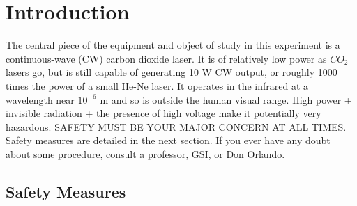 \documentclass{../lab}
\begin{document}
\section{Introduction}

The central piece of the equipment and object of study in this experiment is a continuous-wave (CW) carbon dioxide laser. It is of relatively low power as $CO_2$ lasers go, but is still capable of generating 10 W CW output, or roughly 1000 times the power of a small He-Ne laser. It operates in the infrared at a wavelength near $10^{-6}$ m and so is outside the human visual range. High power + invisible radiation + the presence of high voltage make it potentially very hazardous. SAFETY MUST BE YOUR MAJOR CONCERN AT ALL TIMES. Safety measures are detailed in the next section. If you ever have any doubt about some procedure, consult a professor, GSI, or Don Orlando.

\subsection{Safety Measures}
\end{document}
